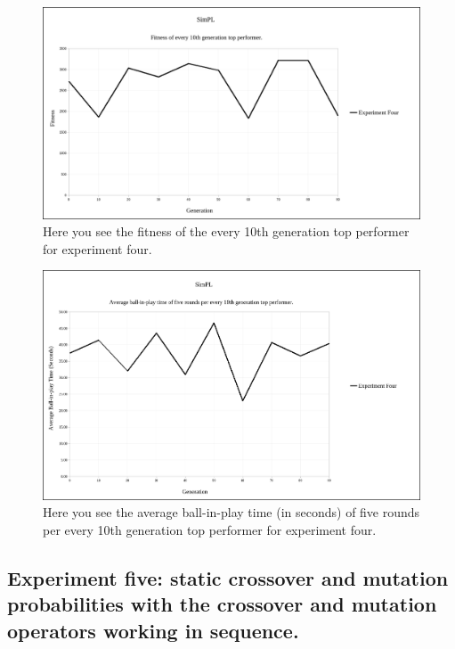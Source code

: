 \documentclass[a4paper,10pt]{article}
\begin{document}
\begin{figure}[H]  
  \centering
  \includegraphics[width=1\textwidth]{figures/exp4_10_tops.png}
  \caption{Here you see the fitness of the every 10th generation top performer for experiment four.}
  \label{fig:exp4_10_tops}
\end{figure}

\begin{figure}[H]  
  \centering
  \includegraphics[width=1\textwidth]{figures/exp4_10_tops_times.png}
  \caption{Here you see the average ball-in-play time (in seconds) of five rounds per every 10th generation top performer for experiment four.}
  \label{fig:exp4_10_tops_times}
\end{figure}

\subsection{Experiment five: static crossover and mutation probabilities with the crossover and mutation operators working in sequence.}
\end{document}
